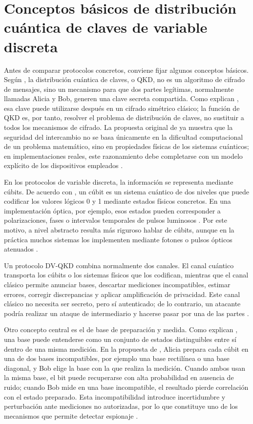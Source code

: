 \section{Conceptos básicos de distribución cuántica de claves de variable discreta}

Antes de comparar protocolos concretos, conviene fijar algunos conceptos básicos. Según \cite{gisin2002}, la distribución cuántica de claves, o QKD, no es un algoritmo de cifrado de mensajes, sino un mecanismo para que dos partes legítimas, normalmente llamadas Alicia y Bob, generen una clave secreta compartida. Como explican \cite{lo2014}, esa clave puede utilizarse después en un cifrado simétrico clásico; la función de QKD es, por tanto, resolver el problema de distribución de claves, no sustituir a todos los mecanismos de cifrado. La propuesta original de \cite{bennett1984} ya muestra que la seguridad del intercambio no se basa únicamente en la dificultad computacional de un problema matemático, sino en propiedades físicas de los sistemas cuánticos; en implementaciones reales, este razonamiento debe completarse con un modelo explícito de los dispositivos empleados \citep{scarani2009,lo2014}.

En los protocolos de variable discreta, la información se representa mediante cúbits. De acuerdo con \cite{nielsen2010}, un cúbit es un sistema cuántico de dos niveles que puede codificar los valores lógicos 0 y 1 mediante estados físicos concretos. En una implementación óptica, por ejemplo, esos estados pueden corresponder a polarizaciones, fases o intervalos temporales de pulsos luminosos \citep{gisin2002,scarani2009}. Por este motivo, a nivel abstracto resulta más riguroso hablar de cúbits, aunque en la práctica muchos sistemas los implementen mediante fotones o pulsos ópticos atenuados \citep{gisin2002,lo2014}.

Un protocolo DV-QKD combina normalmente dos canales. El canal cuántico transporta los cúbits o los sistemas físicos que los codifican, mientras que el canal clásico permite anunciar bases, descartar mediciones incompatibles, estimar errores, corregir discrepancias y aplicar amplificación de privacidad. Este canal clásico no necesita ser secreto, pero sí autenticado; de lo contrario, un atacante podría realizar un ataque de intermediario y hacerse pasar por una de las partes \citep{bennett1984, gisin2002,scarani2009,lo2014}.

Otro concepto central es el de base de preparación y medida. Como explican \cite{nielsen2010}, una base puede entenderse como un conjunto de estados distinguibles entre sí dentro de una misma medición. En la propuesta de \cite{bennett1984}, Alicia prepara cada cúbit en una de dos bases incompatibles, por ejemplo una base rectilínea o una base diagonal, y Bob elige la base con la que realiza la medición. Cuando ambos usan la misma base, el bit puede recuperarse con alta probabilidad en ausencia de ruido; cuando Bob mide en una base incompatible, el resultado pierde correlación con el estado preparado. Esta incompatibilidad introduce incertidumbre y perturbación ante mediciones no autorizadas, por lo que constituye uno de los mecanismos que permite detectar espionaje \citep{scarani2009}.

